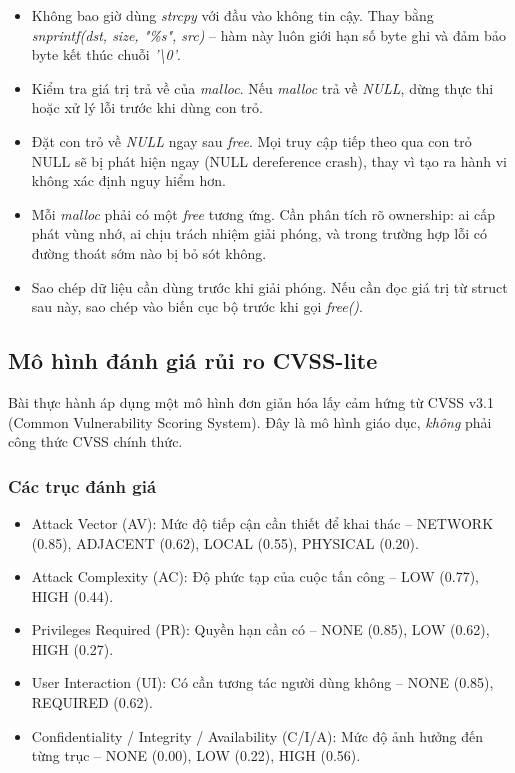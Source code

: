 \begin{itemize}
    \item Không bao giờ dùng \textit{strcpy} với đầu vào không tin cậy.
          Thay bằng \textit{snprintf(dst, size, "\%s", src)} -- hàm này luôn giới
          hạn số byte ghi và đảm bảo byte kết thúc chuỗi \textit{'\textbackslash0'}.
    \item Kiểm tra giá trị trả về của \textit{malloc}. Nếu \textit{malloc}
          trả về \textit{NULL}, dừng thực thi hoặc xử lý lỗi trước khi dùng con
          trỏ.
    \item Đặt con trỏ về \textit{NULL} ngay sau \textit{free}. Mọi truy
          cập tiếp theo qua con trỏ NULL sẽ bị phát hiện ngay (NULL dereference
          crash), thay vì tạo ra hành vi không xác định nguy hiểm hơn.
    \item Mỗi \textit{malloc} phải có một \textit{free} tương ứng. Cần
          phân tích rõ ownership: ai cấp phát vùng nhớ, ai chịu trách nhiệm giải
          phóng, và trong trường hợp lỗi có đường thoát sớm nào bị bỏ sót không.
    \item Sao chép dữ liệu cần dùng trước khi giải phóng. Nếu cần đọc
          giá trị từ struct sau này, sao chép vào biến cục bộ trước khi gọi
          \textit{free()}.
\end{itemize}

\subsection{Mô hình đánh giá rủi ro CVSS-lite}

Bài thực hành áp dụng một mô hình đơn giản hóa lấy cảm hứng từ CVSS v3.1
(Common Vulnerability Scoring System). Đây là mô hình giáo dục, \emph{không}
phải công thức CVSS chính thức.

\subsubsection{Các trục đánh giá}

\begin{itemize}
    \item Attack Vector (AV): Mức độ tiếp cận cần thiết để khai thác
          -- NETWORK (0.85), ADJACENT (0.62), LOCAL (0.55), PHYSICAL (0.20).
    \item Attack Complexity (AC): Độ phức tạp của cuộc tấn công --
          LOW (0.77), HIGH (0.44).
    \item Privileges Required (PR): Quyền hạn cần có -- NONE (0.85),
          LOW (0.62), HIGH (0.27).
    \item User Interaction (UI): Có cần tương tác người dùng không --
          NONE (0.85), REQUIRED (0.62).
    \item Confidentiality / Integrity / Availability (C/I/A):
          Mức độ ảnh hưởng đến từng trục -- NONE (0.00), LOW (0.22), HIGH (0.56).
\end{itemize}

